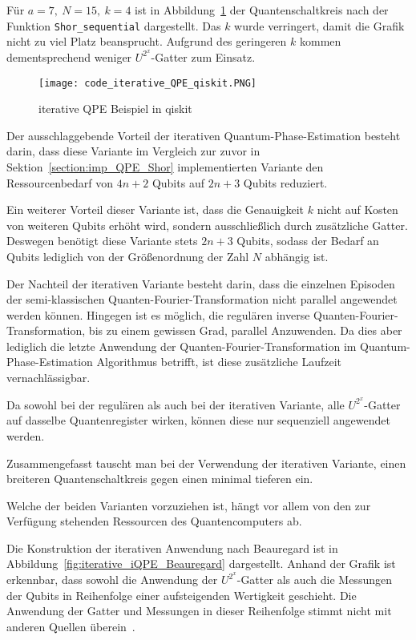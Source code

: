 Für \(a = 7,~N=15,~k=4\) ist in Abbildung~\ref{fig:iterative_iQPE_qiskit} der Quantenschaltkreis nach der Funktion \texttt{Shor\_sequential} dargestellt.
Das \(k\) wurde verringert, damit die Grafik nicht zu viel Platz beansprucht.
Aufgrund des geringeren \(k\) kommen dementsprechend weniger \(U^{2^x}\)-Gatter zum Einsatz.

\begin{figure} [H]
  \centering
  \texttt{[image: code\_iterative\_QPE\_qiskit.PNG]}
  \caption{iterative QPE Beispiel in qiskit}
  \label{fig:iterative_iQPE_qiskit}
\end{figure}

Der ausschlaggebende Vorteil der iterativen Quantum-Phase-Estimation besteht darin, 
dass diese Variante im Vergleich zur zuvor in Sektion~\ref{section:imp_QPE_Shor} implementierten Variante den Ressourcenbedarf von \(4n+2\) Qubits auf \(2n+3\) Qubits reduziert.

Ein weiterer Vorteil dieser Variante ist, 
dass die Genauigkeit \(k\) nicht auf Kosten von weiteren Qubits erhöht wird, 
sondern ausschließlich durch zusätzliche Gatter.
Deswegen benötigt diese Variante stets \(2n+3\) Qubits, 
sodass der Bedarf an Qubits lediglich von der Größenordnung der Zahl \(N\) abhängig ist.

Der Nachteil der iterativen Variante besteht darin, 
dass die einzelnen Episoden der semi-klassischen Quanten-Fourier-Transformation nicht parallel angewendet werden können.
Hingegen ist es möglich, die regulären inverse Quanten-Fourier-Transformation, bis zu einem gewissen Grad, 
parallel Anzuwenden.
Da dies aber lediglich die letzte Anwendung der Quanten-Fourier-Transformation im Quantum-Phase-Estimation Algorithmus betrifft, 
ist diese zusätzliche Laufzeit vernachlässigbar.

Da sowohl bei der regulären als auch bei der iterativen Variante, 
alle \(U^{2^x}\)-Gatter auf dasselbe Quantenregister wirken, 
können diese nur sequenziell angewendet werden.

Zusammengefasst tauscht man bei der Verwendung der iterativen Variante, 
einen breiteren Quantenschaltkreis gegen einen minimal tieferen ein.

Welche der beiden Varianten vorzuziehen ist, 
hängt vor allem von den zur Verfügung stehenden Ressourcen des Quantencomputers ab.

\bigskip

Die Konstruktion der iterativen Anwendung nach Beauregard ist in Abbildung~\ref{fig:iterative_iQPE_Beauregard} dargestellt.
Anhand der Grafik ist erkennbar, 
dass sowohl die Anwendung der \(U^{2^x}\)-Gatter als auch die Messungen der Qubits in Reihenfolge einer aufsteigenden Wertigkeit geschieht.
Die Anwendung der Gatter und Messungen in dieser Reihenfolge stimmt nicht mit anderen Quellen überein~\cite{Parker2000}.

